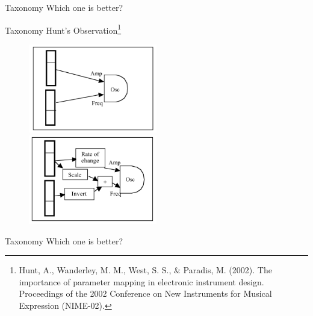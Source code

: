 \documentclass{beamer}
\begin{document}
\begin{frame}{Taxonomy}
    Which one is better?
\end{frame}


\begin{frame}{Taxonomy}
    Hunt's Observation\footnote{Hunt, A., Wanderley, M. M., West, S. S., \& Paradis, M. (2002). The importance of parameter mapping in electronic instrument design. Proceedings of the 2002 Conference on New Instruments for Musical Expression (NIME-02).}
    \begin{figure}[h]
        \includegraphics[width=0.5\textwidth]{hunt_simple.png}
        \includegraphics[width=0.5\textwidth]{hunt_complex.png}
    \end{figure}
\end{frame}

\begin{frame}{Taxonomy}
    Which one is better?
\end{frame}

\end{document}
